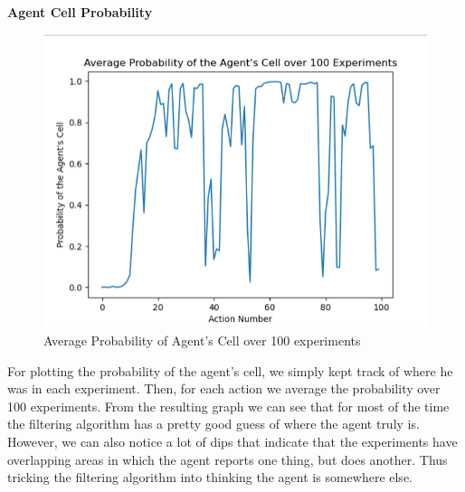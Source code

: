 \documentclass{article}
\begin{document}
        \clearpage
        \textbf{Agent Cell Probability}\\
        \begin{figure}[H]
            \centering
            \includegraphics[width=\linewidth]{images/agent_cell_prob.png}
            \caption{Average Probability of Agent's Cell over 100 experiments}
            \label{fig:agent_prob}
            \small
        \end{figure}
        For plotting the probability of the agent's cell, we simply kept track of where he was in each experiment.
        Then, for each action we average the probability over 100 experiments. From the resulting graph we can see
        that for most of the time the filtering algorithm has a pretty good guess of where the agent truly is.
        However, we can also notice a lot of dips that indicate that the experiments have overlapping areas in
        which the agent reports one thing, but does another. Thus tricking the filtering algorithm into thinking
        the agent is somewhere else.

\newpage
\end{document}
